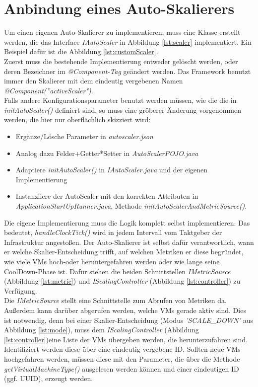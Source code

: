 \section{Anbindung eines Auto-Skalierers}
\label{sec:Konfiguration:AnbindungScaler}
Um einen eigenen Auto-Skalierer zu implementieren, muss eine Klasse erstellt werden, die das Interface \textit{IAutoScaler} in Abbildung \ref{lst:scaler} implementiert. Ein Beispiel dafür ist die Abbildung \ref{lst:customScaler}. \\
Zuerst muss die bestehende Implementierung entweder gelöscht werden, oder deren Bezeichner im \textit{@Component-Tag} geändert werden. Das Framework benutzt immer den Skalierer mit dem eindeutig vergebenen Namen \textit{@Component(''activeScaler")}. \\
Falls andere Konfigurationsparameter benutzt werden müssen, wie die die in \textit{initAutoScaler()} definiert sind, so muss eine gröberer Änderung vorgenommen werden, die hier nur oberflächlich skizziert wird:
\begin{itemize}
	\item Ergänze/Lösche Parameter in \textit{autoscaler.json}
	\item Analog dazu Felder+Getter*Setter in \textit{AutoScalerPOJO.java}
	\item Adaptiere \textit{initAutoScaler()} in \textit{IAutoScaler.java} und der eigenen Implementierung
	\item Instanziiere der AutoScaler mit den korrekten Attributen in \textit{ApplicationStartUpRunner.java}, Methode \textit{initAutoScalerAndMetricSource()}.
\end{itemize}

\noindent
Die eigene Implementierung muss die Logik komplett selbst implementieren. Das bedeutet, \textit{handleClockTick()} wird in jedem Intervall vom Taktgeber der Infrastruktur angestoßen. Der Auto-Skalierer ist selbst dafür verantwortlich, wann er welche Skalier-Entscheidung trifft, auf welchen Metriken er diese begründet, wie viele VMs hoch-oder heruntergefahren werden oder wie lange seine CoolDown-Phase ist. Dafür stehen die beiden Schnittstellen \textit{IMetricSource} (Abbildung \ref{lst:metric}) und \textit{IScalingController} (Abbildung \ref{lst:controller}) zu Verfügung. \\
Die \textit{IMetricSource} stellt eine Schnittstelle zum Abrufen von Metriken da. Außerdem kann darüber abgerufen werden, welche VMs gerade aktiv sind. Dies ist notwendig, denn bei einer Skalier-Entscheidung (Modus \textit{'SCALE\_DOWN'} aus Abbildung \ref{lst:mode}), muss dem \textit{IScalingController} (Abbildung \ref{lst:controller})eine Liste der VMs übergeben werden, die herunterzufahren sind. Identifiziert werden diese über eine eindeutig vergebene ID. Sollten neue VMs hochgefahren werden, müssen diese mit den Parameter, die über die Methode \textit{getVirtualMachineType()} ausgelesen werden können und einer eindeutigen ID (ggf. UUID), erzeugt werden. \\

